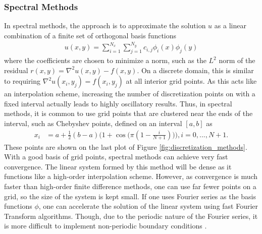 \subsubsection{Spectral Methods}

In spectral methods, the approach is to approximate the solution $u$ as a linear combination of a finite set of orthogonal basis functions
\begin{align}
    u(x,y) = \sum_{i=1}^{N_x} \sum_{j=1}^{N_y} c_{i,j} \phi_{i}(x) \phi_{j}(y)
\end{align}
where the coefficients are chosen to minimize a norm, such as the $L^2$ norm of the residual $r(x,y) = \nabla^2 u(x,y) - f(x,y)$. On a discrete domain, this is similar to requiring $\nabla^2 u(x_i, y_j) = f(x_i, y_j)$ at all interior grid points. As this acts like an interpolation scheme, increasing the number of discretization points on with a fixed interval actually leads to highly oscillatory results. Thus, in spectral methods, it is common to use grid points that are clustered near the ends of the interval, such as Chebyshev points, defined on an interval $[a,b]$ as
\begin{align}
    x_i &= a + \frac{1}{2}(b - a)\Big(1 + \cos \big( \pi (1 - \frac{i}{N + 1}) \big) \Big), i = 0, ..., N + 1.
\end{align}
These points are shown on the last plot of Figure \ref{fig:discretization_methods}. With a good basis of grid points, spectral methods can achieve very fast convergence. The linear system formed by this method will be dense as it functions like a high-order interpolation scheme. However, as convergence is much faster than high-order finite difference methods, one can use far fewer points on a grid, so the size of the system is kept small. If one uses Fourier series as the basis functions $\phi$, one can accelerate the solution of the linear system using fast Fourier Transform algorithms. Though, due to the periodic nature of the Fourier series, it is more difficult to implement non-periodic boundary conditions \citep{leveque2007finite,townsend2015automatic}.




